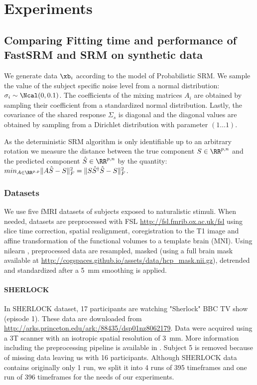 \section{Experiments}
\subsection{Comparing Fitting time and performance of FastSRM and
  SRM on synthetic data}
We generate data $\xb_i$ according to the model of Probabilistic SRM. We sample the value of the subject specific noise level from a normal
distribution: $\sigma_i \sim \Ncal(0, 0.1)$. The coefficients of the mixing matrices $A_i$
are obtained by sampling their coefficient from a standardized normal distribution.
Lastly, the covariance of the shared response $\Sigma_s$ is diagonal and the
diagonal values are obtained by sampling from a Dirichlet distribution with
parameter $(1 \dots 1)$.

As the deterministic SRM algorithm is only identifiable up to an arbitrary
rotation we measure the distance between the true component $S \in \RR^{p, n}$ and
the predicted component $\hat{S} \in \RR^{p, n}$ by the quantity:
$min_{A \in \RR^{p, p}} \|A \hat{S} - S \|^2_F =  \|S \hat{S}^{\dagger}\hat{S} - S \|^2_F$.






\subsubsection{Datasets}

We use five fMRI datasets of subjects exposed to naturalistic stimuli. When needed, datasets are preprocessed with FSL \url{http://fsl.fmrib.ox.ac.uk/fsl} using slice time correction, spatial realignment, coregistration to the T1 image and affine transformation of the functional volumes to a template brain (MNI). Using nilearn \cite{abraham2014machine}, preprocessed data are resampled, masked (using a full brain mask available at \url{http://cogspaces.github.io/assets/data/hcp_mask.nii.gz}), detrended and standardized after a 5 mm smoothing is applied.  
%
\paragraph{SHERLOCK}
In SHERLOCK dataset, 17 participants are watching "Sherlock" BBC TV show (episode 1). 
%
These data are downloaded from \url{http://arks.princeton.edu/ark:/88435/dsp01nz8062179}. 
%
Data were acquired using a 3T scanner with an isotropic spatial resolution of 3 mm. 
%
More information including the preprocessing pipeline is available in \cite{sherlock}.
%
Subject 5 is removed because of missing data leaving us with 16 participants.
%
Although SHERLOCK data contains originally only 1 run, we split it into 4 runs of 395 timeframes and one run of 396 timeframes for the needs of our experiments. 


